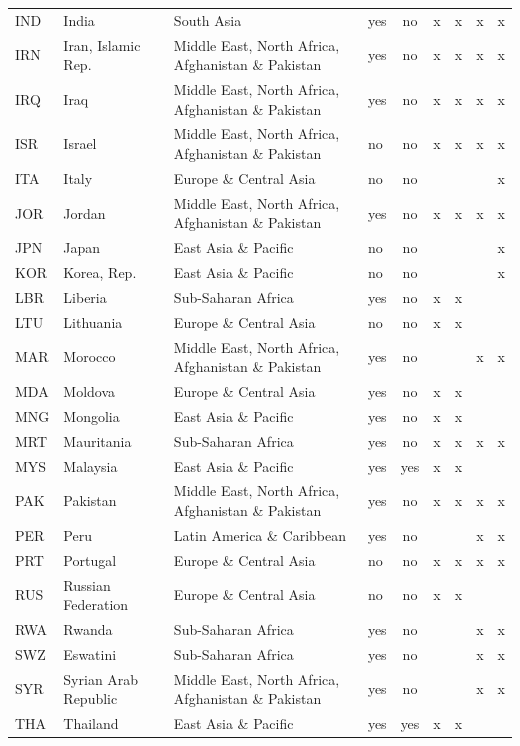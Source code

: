 \begin{table}[htbp]
\begin{tabular}{llllcccc}
IND & India & South Asia & yes & no & x & x & x & x \\
IRN & Iran, Islamic Rep. & Middle East, North Africa, Afghanistan \& Pakistan & yes & no & x & x & x & x \\
IRQ & Iraq & Middle East, North Africa, Afghanistan \& Pakistan & yes & no & x & x & x & x \\
ISR & Israel & Middle East, North Africa, Afghanistan \& Pakistan & no & no & x & x & x & x \\
ITA & Italy & Europe \& Central Asia & no & no &  &  &  & x \\
JOR & Jordan & Middle East, North Africa, Afghanistan \& Pakistan & yes & no & x & x & x & x \\
JPN & Japan & East Asia \& Pacific & no & no &  &  &  & x \\
KOR & Korea, Rep. & East Asia \& Pacific & no & no &  &  &  & x \\
LBR & Liberia & Sub-Saharan Africa & yes & no & x & x &  &  \\
LTU & Lithuania & Europe \& Central Asia & no & no & x & x &  &  \\
MAR & Morocco & Middle East, North Africa, Afghanistan \& Pakistan & yes & no &  &  & x & x \\
MDA & Moldova & Europe \& Central Asia & yes & no & x & x &  &  \\
MNG & Mongolia & East Asia \& Pacific & yes & no & x & x &  &  \\
MRT & Mauritania & Sub-Saharan Africa & yes & no & x & x & x & x \\
MYS & Malaysia & East Asia \& Pacific & yes & yes & x & x &  &  \\
PAK & Pakistan & Middle East, North Africa, Afghanistan \& Pakistan & yes & no & x & x & x & x \\
PER & Peru & Latin America \& Caribbean & yes & no &  &  & x & x \\
PRT & Portugal & Europe \& Central Asia & no & no & x & x & x & x \\
RUS & Russian Federation & Europe \& Central Asia & no & no & x & x &  &  \\
RWA & Rwanda & Sub-Saharan Africa & yes & no &  &  & x & x \\
SWZ & Eswatini & Sub-Saharan Africa & yes & no &  &  & x & x \\
SYR & Syrian Arab Republic & Middle East, North Africa, Afghanistan \& Pakistan & yes & no &  &  & x & x \\
THA & Thailand & East Asia \& Pacific & yes & yes & x & x &  &  \\

\end{tabular}
\end{table}
